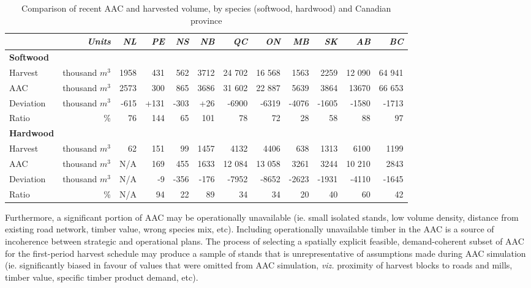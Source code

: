 \begin{table}[H]
\caption{Comparison of recent AAC and harvested volume, by species
(softwood, hardwood) and Canadian province \citep{ccfm2005wood}}
\label{tab:harvestcontrol}
\renewcommand{\tabcolsep}{4pt}
\begin{tabular}{lrrrrrrrrrrr}
\toprule
 & \emph{Units} & \emph{NL} & \emph{PE} & \emph{NS} & \emph{NB} & \emph{QC} & \emph{ON} & \emph{MB} & \emph{SK} & \emph{AB} & \emph{BC}\tabularnewline
\midrule
\textbf{\small Softwood} &  &  &  &  &  &  &  &  &  &  & \tabularnewline
{\small Harvest} & {\small thousand $m^{3}$} & {\small 1958} & {\small 431} & {\small 562} & {\small 3712} & {\small 24 702} & {\small 16 568} & {\small 1563} & {\small 2259} & {\small 12 090} & {\small 64 941}\tabularnewline
{\small AAC} & {\small thousand $m^{3}$} & {\small 2573} & {\small 300} & {\small 865} & {\small 3686} & {\small 31 602} & {\small 22 887} & {\small 5639} & {\small 3864} & {\small 13670} & {\small 66 653}\tabularnewline
{\small Deviation} & {\small thousand $m^{3}$} & {\small -615} & {\small +131} & {\small -303} & {\small +26} & {\small -6900} & {\small -6319} & {\small -4076} & {\small -1605} & {\small -1580} & {\small -1713}\tabularnewline
{\small Ratio} & {\small \%} & {\small 76} & {\small 144} & {\small 65} & {\small 101} & {\small 78} & {\small 72} & {\small 28} & {\small 58} & {\small 88} & {\small 97}\tabularnewline
\textbf{\small Hardwood} &  &  &  &  &  &  &  &  &  &  & \tabularnewline
{\small Harvest} & {\small thousand $m^{3}$} & {\small 62} & {\small 151} & {\small 99} & {\small 1457} & {\small 4132} & {\small 4406} & {\small 638} & {\small 1313} & {\small 6100} & {\small 1199}\tabularnewline
{\small AAC} & {\small thousand $m^{3}$} & {\small N/A} & {\small 169} & {\small 455} & {\small 1633} & {\small 12 084} & {\small 13 058} & {\small 3261} & {\small 3244} & {\small 10 210} & {\small 2843}\tabularnewline
{\small Deviation} & {\small thousand $m^{3}$} & {\small N/A} & {\small -9} & {\small -356} & {\small -176} & {\small -7952} & {\small -8652} & {\small -2623} & {\small -1931} & {\small -4110} & {\small -1645}\tabularnewline
{\small Ratio} & {\small \%} & {\small N/A} & {\small 94} & {\small 22} & {\small 89} & {\small 34} & {\small 34} & {\small 20} & {\small 40} & {\small 60} & {\small 42}\tabularnewline
\bottomrule
\end{tabular}
\end{table}

Furthermore, a significant portion of AAC may be operationally unavailable
(ie. small isolated stands, low volume density, distance from existing
road network, timber value, wrong species mix, etc). Including
operationally unavailable timber in the AAC is a source of incoherence
between strategic and operational plans. The process of selecting
a spatially explicit feasible, demand-coherent subset of AAC for the first-period
harvest schedule may produce a sample of stands that is unrepresentative
of assumptions made during AAC simulation (ie. significantly biased
in favour of values that were omitted from AAC simulation, \emph{viz.}
proximity of harvest blocks to roads and mills, timber value, specific
timber product demand, etc). 

